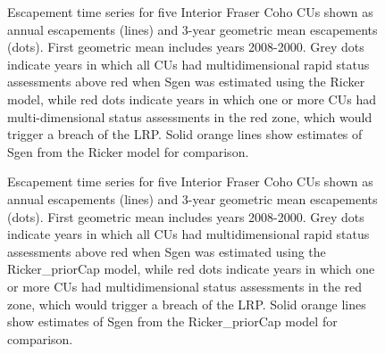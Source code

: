 \documentclass[11pt]{book}
\begin{document}
\begin{figure}[htb]

{\centering {} 

}

\caption{Escapement time series for five Interior Fraser Coho CUs shown as annual escapements (lines) and 3-year geometric mean escapements (dots). First geometric mean includes years 2008-2000. Grey dots indicate years in which all CUs had multidimensional rapid status assessments above red when Sgen was estimated using the Ricker model, while red dots indicate years in which one or more CUs had multi-dimensional status assessments in the red zone, which would trigger a breach of the LRP. Solid orange lines show estimates of Sgen from the Ricker model for comparison.}\label{fig:coho-CU-multiDim-Ricker}
\end{figure}
\begin{figure}[htb]

{\centering {} 

}

\caption{Escapement time series for five Interior Fraser Coho CUs shown as annual escapements (lines) and 3-year geometric mean escapements (dots). First geometric mean includes years 2008-2000. Grey dots indicate years in which all CUs had multidimensional rapid status assessments above red when Sgen was estimated using the Ricker\_priorCap model, while red dots indicate years in which one or more CUs had multidimensional status assessments in the red zone, which would trigger a breach of the LRP. Solid orange lines show estimates of Sgen from the Ricker\_priorCap model for comparison.}\label{fig:coho-CU-multiDim-Ricker-Cap}
\end{figure}
\end{document}
